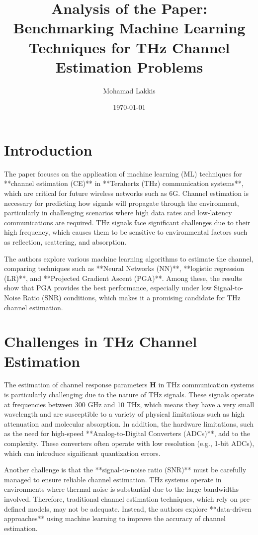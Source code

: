 \documentclass{article}
\begin{document}
\title{Analysis of the Paper: Benchmarking Machine Learning Techniques for THz Channel Estimation Problems}
\author{Mohamad Lakkis}
\date{\today}
\maketitle

\section{Introduction}

The paper focuses on the application of machine learning (ML) techniques for **channel estimation (CE)** in **Terahertz (THz) communication systems**, which are critical for future wireless networks such as 6G. Channel estimation is necessary for predicting how signals will propagate through the environment, particularly in challenging scenarios where high data rates and low-latency communications are required. THz signals face significant challenges due to their high frequency, which causes them to be sensitive to environmental factors such as reflection, scattering, and absorption.

The authors explore various machine learning algorithms to estimate the channel, comparing techniques such as **Neural Networks (NN)**, **logistic regression (LR)**, and **Projected Gradient Ascent (PGA)**. Among these, the results show that PGA provides the best performance, especially under low Signal-to-Noise Ratio (SNR) conditions, which makes it a promising candidate for THz channel estimation.

\section{Challenges in THz Channel Estimation}

The estimation of channel response parameters \( \mathbf{H} \) in THz communication systems is particularly challenging due to the nature of THz signals. These signals operate at frequencies between 300 GHz and 10 THz, which means they have a very small wavelength and are susceptible to a variety of physical limitations such as high attenuation and molecular absorption. In addition, the hardware limitations, such as the need for high-speed **Analog-to-Digital Converters (ADCs)**, add to the complexity. These converters often operate with low resolution (e.g., 1-bit ADCs), which can introduce significant quantization errors.

Another challenge is that the **signal-to-noise ratio (SNR)** must be carefully managed to ensure reliable channel estimation. THz systems operate in environments where thermal noise is substantial due to the large bandwidths involved. Therefore, traditional channel estimation techniques, which rely on pre-defined models, may not be adequate. Instead, the authors explore **data-driven approaches** using machine learning to improve the accuracy of channel estimation.
\end{document}
